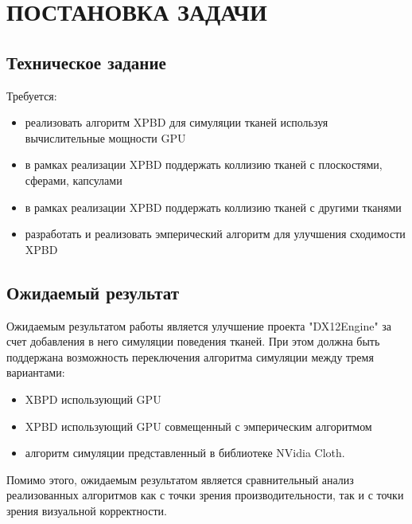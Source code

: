 \chapter{ПОСТАНОВКА ЗАДАЧИ} \label{ch1}

\section{Техническое задание} \label{ch1:sec1}
Требуется:
\begin{itemize}
	\item реализовать алгоритм XPBD для симуляции тканей используя вычислительные мощности GPU
	\item в рамках реализации XPBD поддержать коллизию тканей с плоскостями, сферами, капсулами
	\item в рамках реализации XPBD поддержать коллизию тканей с другими тканями
	\item разработать и реализовать эмперический алгоритм для улучшения сходимости XPBD
\end{itemize}

\section{Ожидаемый результат} \label{ch1:sec2}
Ожидаемым результатом работы является улучшение проекта "DX12Engine" за счет добавления в него симуляции поведения тканей. При этом должна быть поддержана возможность переключения алгоритма симуляции между тремя вариантами: 
\begin{itemize}
	\item XBPD использующий GPU
	\item XPBD использующий GPU совмещенный с эмперическим алгоритмом
	\item алгоритм симуляции представленный в библиотеке NVidia Cloth.
\end{itemize}
Помимо этого, ожидаемым результатом является сравнительный анализ реализованных алгоритмов как с точки зрения производительности, так и с точки зрения визуальной корректности.




